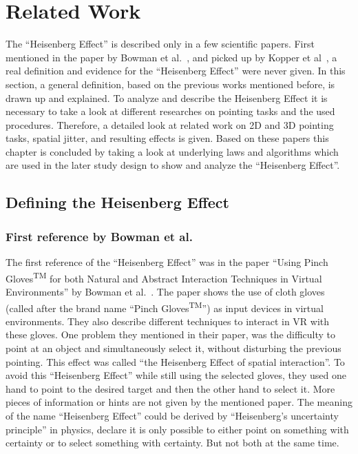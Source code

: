 
\chapter{Related Work}
\label{ch:related-work}

The ``Heisenberg Effect'' is described only in a few scientific papers. First mentioned in the paper by Bowman et al.~\cite{bowman_using_2001}, and picked up by Kopper et al~\cite{kopper_human_2010}, a real definition and evidence for the ``Heisenberg Effect'' were never given. In this section, a general definition, based on the previous works mentioned before, is drawn up and explained. To analyze and describe the Heisenberg Effect it is necessary to take a look at different researches on pointing tasks and the used procedures. Therefore, a detailed look at related work on 2D and 3D pointing tasks, spatial jitter, and resulting effects is given. Based on these papers this chapter is concluded by taking a look at underlying laws and algorithms which are used in the later study design to show and analyze the ``Heisenberg Effect''.

\section{Defining the Heisenberg Effect}
\label{sec:related-work:defining-heisenberg-effect}

\subsection{First reference by Bowman et al.}
\label{subsec:related-work:defining-heisenberg-effect:first-reference}

The first reference of the ``Heisenberg Effect'' was in the paper ``Using Pinch Gloves\textsuperscript{TM} for both Natural and Abstract Interaction Techniques in Virtual Environments'' by Bowman et al.~\cite{bowman_using_2001}. The paper shows the use of cloth gloves (called after the brand name ``Pinch Gloves\textsuperscript{TM}'') as input devices in virtual environments. They also describe different techniques to interact in VR with these gloves.  One problem they mentioned in their paper, was the difficulty to point at an object and simultaneously select it, without disturbing the previous pointing. This effect was called ``the Heisenberg Effect of spatial interaction''. To avoid this ``Heisenberg Effect'' while still using the selected gloves, they used one hand to point to the desired target and then the other hand to select it. More pieces of information or hints are not given by the mentioned paper. The meaning of the name ``Heisenberg Effect'' could be derived by ``Heisenberg's uncertainty principle'' in physics, declare it is only possible to either point on something with certainty or to select something with certainty. But not both at the same time.

